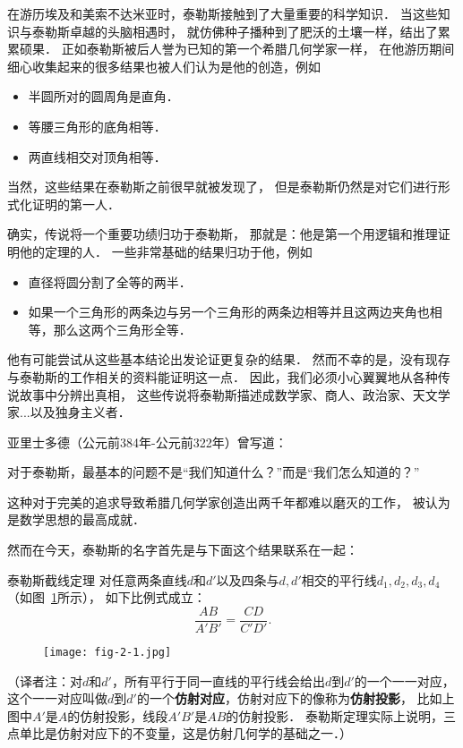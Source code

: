 \documentclass[cn,fancy,blue,11pt]{elegantbook}
\begin{document}
在游历埃及和美索不达米亚时，泰勒斯接触到了大量重要的科学知识．
当这些知识与泰勒斯卓越的头脑相遇时，
就仿佛种子播种到了肥沃的土壤一样，结出了累累硕果．
正如泰勒斯被后人誉为已知的第一个希腊几何学家一样，
在他游历期间细心收集起来的很多结果也被人们认为是他的创造，例如
\begin{itemize}
	\item 半圆所对的圆周角是直角．
	\item 等腰三角形的底角相等．
	\item 两直线相交对顶角相等．
\end{itemize}
当然，这些结果在泰勒斯之前很早就被发现了，
但是泰勒斯仍然是对它们进行形式化证明的第一人．

确实，传说将一个重要功绩归功于泰勒斯，
那就是：他是第一个用逻辑和推理证明他的定理的人．
一些非常基础的结果归功于他，例如
\begin{itemize}
	\item 直径将圆分割了全等的两半．
	\item 如果一个三角形的两条边与另一个三角形的两条边相等并且这两边夹角也相等，那么这两个三角形全等．
\end{itemize}
他有可能尝试从这些基本结论出发论证更复杂的结果．
然而不幸的是，没有现存与泰勒斯的工作相关的资料能证明这一点．
因此，我们必须小心翼翼地从各种传说故事中分辨出真相，
这些传说将泰勒斯描述成数学家、商人、政治家、天文学家...以及独身主义者．

亚里士多德（公元前384年-公元前322年）曾写道：
\begin{framed}
	对于泰勒斯，最基本的问题不是``我们知道什么？''而是``我们怎么知道的？''
\end{framed}
这种对于完美的追求导致希腊几何学家创造出两千年都难以磨灭的工作，
被认为是数学思想的最高成就．

然而在今天，泰勒斯的名字首先是与下面这个结果联系在一起：

\begin{theorem*}{泰勒斯截线定理}{}
	对任意两条直线$d$和$d'$以及四条与$d,d'$相交的平行线$d_1,d_2,d_3,d_4$（如图~\ref{fig:2-1}所示），
	如下比例式成立：
	\[\frac{AB}{A'B'}=\frac{CD}{C'D'}.\]
\end{theorem*}

\begin{figure}[htbp]
	\centering
	\texttt{[image: fig-2-1.jpg]}
	\caption{\label{fig:2-1}}
\end{figure}

（译者注：对$d$和$d'$，所有平行于同一直线的平行线会给出$d$到$d'$的一个一一对应，
这个一一对应叫做$d$到$d'$的一个\textbf{仿射对应}，仿射对应下的像称为\textbf{仿射投影}，
比如上图中$A'$是$A$的仿射投影，线段$A'B'$是$AB$的仿射投影．
泰勒斯定理实际上说明，三点单比是仿射对应下的不变量，这是仿射几何学的基础之一．）
\vskip 10pt
\end{document}
